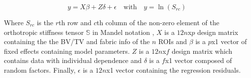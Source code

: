 \documentclass[a4paper,fleqn]{DC_ArtStyle}
\providecommand{\DIFadd}[1]{{\protect\color{blue}{#1}}} %
\providecommand{\DIFaddbegin}{} %
\providecommand{\DIFaddend}{} %
\begin{document}
\begin{equation}
	y = X \beta + Z \delta + \epsilon \quad \text{with} \quad y = \ln(S_{rc})
	\label{Eq204}
\end{equation}

Where $S_{rc}$ is the $r$th row and $c$th column of the non-zero element of the orthotropic stiffness tensor $\mathbb{S}$ in Mandel notation \cite{MANDEL1965}, $X$ is a $12n$x$p$ design matrix containing the the BV/TV and fabric info of the $n$ ROIs and $\beta$ is a $p$x1 vector of fixed effects containing model parameters. $Z$ is a $12n$x$f$ design matrix which contains data with individual dependence and $\delta$ is a $f$x1 vector composed of random factors. Finally, $\epsilon$ is a $12n$x1 vector containing the regression residuals. \DIFaddbegin \DIFadd{As $k$ and $l$ are exponents, the regression was performed on the log space.}\DIFaddend \\
\end{document}

